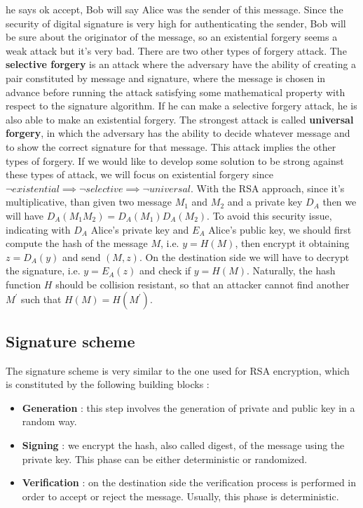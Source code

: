 \documentclass[11pt]{article}
\begin{document}
he says ok accept, Bob will say Alice was the sender of this message. Since the security of digital signature is very high for authenticating the sender, Bob will be sure about the originator of the message, so an existential forgery seems a weak attack but it's very bad. There are two other types of forgery attack. The \textbf{selective forgery} is an attack where the adversary have the ability of creating a pair constituted by message and signature, where the message is chosen in advance before running the attack satisfying some mathematical property with respect to the signature algorithm. If he can make a selective forgery attack, he is also able to make an existential forgery. The strongest attack is called \textbf{universal forgery}, in which the adversary has the ability to decide whatever message and to show the correct signature for that message. This attack implies the other types of forgery. If we would like to develop some solution to be strong against these types of attack, we will focus on existential forgery since $\lnot existential \implies \lnot selective \implies \lnot universal$. With the RSA approach, since it's multiplicative, than given two message $M_1$ and $M_2$ and a private key $D_A$ then we will have $D_A(M_1 M_2) = D_A(M_1) D_A(M_2)$. To avoid this security issue, indicating with $D_A$ Alice's private key and $E_A$ Alice's public key, we should first compute the hash of the message $M$, i.e. $y = H(M)$, then encrypt it obtaining $z = D_A(y)$ and send $(M, z)$. On the destination side we will have to decrypt the signature, i.e. $y = E_A(z) $ and check if $y = H(M)$. Naturally, the hash function $H$ should be collision resistant, so that an attacker cannot find another $M^{'}$ such that $H(M) = H(M^{'})$.
\subsection{Signature scheme}
The signature scheme is very similar to the one used for RSA encryption, which is constituted by the following building blocks :
\begin{itemize}
\item \textbf{Generation} : this step involves the generation of private and public key in a random way.
\item \textbf{Signing} : we encrypt the hash, also called digest, of the message using the private key. This phase can be either deterministic or randomized.
\item \textbf{Verification} : on the destination side the verification process is performed in order to accept or reject the message. Usually, this phase is deterministic.
\end{itemize}
\end{document}
